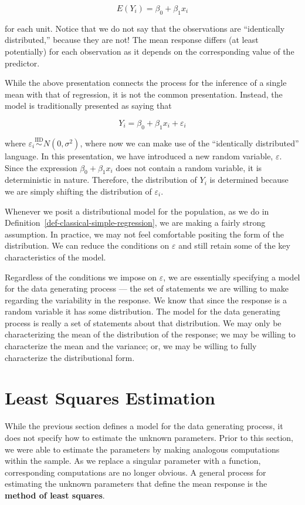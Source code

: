 \documentclass[
  letterpaper,
  DIV=11,
  numbers=noendperiod]{scrreprt}
\theoremstyle{definition}
\theoremstyle{plain}
\theoremstyle{definition}
\theoremstyle{remark}
\begin{document}
\[E\left(Y_i\right) = \beta_0 + \beta_1 x_i\]

for each unit. Notice that we do not say that the observations are
``identically distributed,'' because they are not! The mean response
differs (at least potentially) for each observation as it depends on the
corresponding value of the predictor.

While the above presentation connects the process for the inference of a
single mean with that of regression, it is not the common presentation.
Instead, the model is traditionally presented as saying that

\[Y_i = \beta_0 + \beta_1 x_i + \varepsilon_i\]

where
\(\varepsilon_i \stackrel{\text{IID}}{\sim} N\left(0, \sigma^2\right)\),
where now we can make use of the ``identically distributed'' language.
In this presentation, we have introduced a new random variable,
\(\varepsilon\). Since the expression \(\beta_0 + \beta_1 x_i\) does not
contain a random variable, it is deterministic in nature. Therefore, the
distribution of \(Y_i\) is determined because we are simply shifting the
distribution of \(\varepsilon_i\).

Whenever we posit a distributional model for the population, as we do in
Definition~\ref{def-classical-simple-regression}, we are making a fairly
strong assumption. In practice, we may not feel comfortable positing the
form of the distribution. We can reduce the conditions on
\(\varepsilon\) and still retain some of the key characteristics of the
model.

Regardless of the conditions we impose on \(\varepsilon\), we are
essentially specifying a model for the data generating process --- the
set of statements we are willing to make regarding the variability in
the response. We know that since the response is a random variable it
has some distribution. The model for the data generating process is
really a set of statements about that distribution. We may only be
characterizing the mean of the distribution of the response; we may be
willing to characterize the mean and the variance; or, we may be willing
to fully characterize the distributional form.

\section{Least Squares Estimation}\label{least-squares-estimation}

While the previous section defines a model for the data generating
process, it does not specify how to estimate the unknown parameters.
Prior to this section, we were able to estimate the parameters by making
analogous computations within the sample. As we replace a singular
parameter with a function, corresponding computations are no longer
obvious. A general process for estimating the unknown parameters that
define the mean response is the \textbf{method of least squares}.
\end{document}

